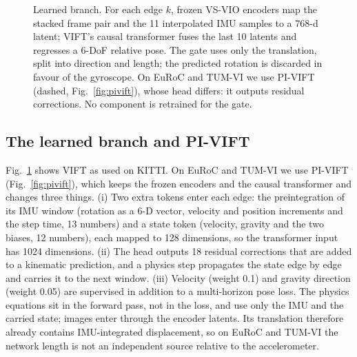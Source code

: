 \documentclass[letterpaper,journal]{IEEEtran}
\newcommand{\dnet}{\mathbf{d}_{\mathrm{net}}}
\begin{document}
\begin{figure}[t]
{}
\caption{Learned branch. For each edge $k$, frozen VS-VIO encoders map the stacked frame pair and the 11 interpolated IMU samples to a 768-d latent; VIFT's causal transformer fuses the last 10 latents and regresses a 6-DoF relative pose. The gate uses only the translation, split into direction and length; the predicted rotation is discarded in favour of the gyroscope. On EuRoC and TUM-VI we use PI-VIFT (dashed, Fig.~\ref{fig:pivift}), whose head differs: it outputs residual corrections. No component is retrained for the gate.}
\label{fig:net}
\end{figure}

\subsection{The learned branch and PI-VIFT}
\label{sec:learned}
Fig.~\ref{fig:net} shows VIFT as used on KITTI. On EuRoC and TUM-VI we use PI-VIFT (Fig.~\ref{fig:pivift}), which keeps the frozen encoders and the causal transformer and changes three things. (i) Two extra tokens enter each edge: the preintegration of its IMU window (rotation as a 6-D vector, velocity and position increments and the step time, 13 numbers) and a state token (velocity, gravity and the two biases, 12 numbers), each mapped to 128 dimensions, so the transformer input has 1024 dimensions. (ii) The head outputs 18 residual corrections that are added to a kinematic prediction, and a physics step propagates the state edge by edge and carries it to the next window. (iii) Velocity (weight 0.1) and gravity direction (weight 0.05) are supervised in addition to a multi-horizon pose loss. The physics equations sit in the forward pass, not in the loss, and use only the IMU and the carried state; images enter through the encoder latents. Its translation therefore already contains IMU-integrated displacement, so on EuRoC and TUM-VI the network length is not an independent source relative to the accelerometer.
\end{document}
